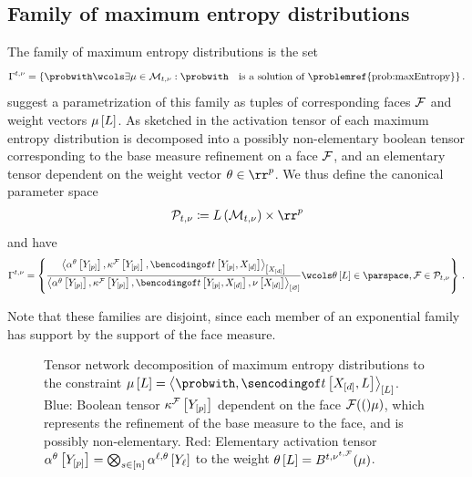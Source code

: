 \subsection{Family of maximum entropy distributions}


The family of maximum entropy distributions is the set
\begin{align*}
    \maxentfamilyof{\sstat}{\basemeasure} =
    \{\probwith \wcols \exists\meanparam\in\genmeanset : \probwith \quad\text{is a solution of \problemref{prob:maxEntropy}} \} \, .
\end{align*}
 suggest a parametrization of this family as tuples of corresponding faces $\mathcal{F}$ and weight vectors $\mu\left[L\right]$.
As sketched in  the activation tensor of each maximum entropy distribution is decomposed into a possibly non-elementary boolean tensor corresponding to the base measure refinement on a face $\mathcal{F}$, and an elementary tensor dependent on the weight vector $\weightparamin$.
We thus define the canonical parameter space
\begin{align*}
    \gencanparamset
    \coloneqq \facelatticeof{\genmeanset} \times \weightspace
\end{align*}
and have
\begin{align*}
    \maxentfamilyof{\sstat}{\basemeasure} =
    \left\{
        \frac{
            \contractionof{\softacttensorat{\headvariables},\kcoreofat{\facesymbol}{\headvariables},\bencsstatwith}{\shortcatvariables}
        }{
            \contraction{\softacttensorat{\headvariables},\kcoreofat{\facesymbol}{\headvariables},\bencsstatwith,\basemeasurewith}
        }
        \wcols \canparamwithin,\facesymbol\in\gencanparamset
    \right\} \, .
\end{align*}

Note that these families are disjoint, since each member of an exponential family has support by the support of the face measure.

\begin{figure}[t]
    \begin{center}
        
    \end{center}
    \caption{
        Tensor network decomposition of maximum entropy distributions to the constraint $\meanparamat{\selvariable}=\contractionof{\probwith,\sencsstatwith}{\selvariable}$.
        Blue: Boolean tensor $\kappa^{\mathcal{F}}\left[Y_{[p]}\right]$ dependent on the face $\mathcal{F}(()\mu)$, which represents the refinement of the base measure to the face, and is possibly non-elementary.
        Red: Elementary activation tensor $\alpha^\theta\left[Y_{[p]}\right]=\bigotimes_{s\in[n]}\alpha^{\ell,\theta}\left[Y_{\ell}\right]$ to the weight $\theta\left[L\right]= B^{t,\nu^{t,\mathcal{F}}}(\mu)$.
    }\label{fig:maxEntropyActcore}
\end{figure}
